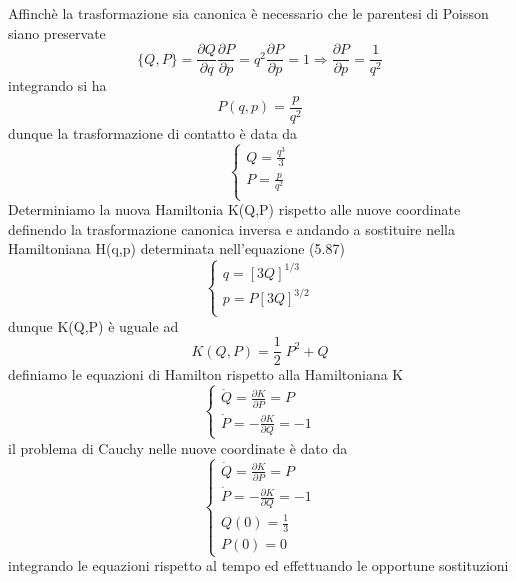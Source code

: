 Affinch\`{e} la trasformazione sia canonica \`{e} necessario che le parentesi di Poisson siano preservate
\begin{equation*}
	\{Q,P\} = \frac{\partial Q}{\partial q}\frac{\partial P}{\partial p}= q^2 \frac{\partial P}{\partial p} = 1 \Rightarrow \frac{\partial P}{\partial p} = \frac{1}{q^2}
\end{equation*}
integrando si ha 
\begin{equation}
	P(q,p) = \frac{p}{q^2}
\end{equation}
dunque la trasformazione di contatto \`{e} data da
\begin{equation}
\begin{cases}
		Q = \frac{q^3}{3} \\
		P = \frac{p}{q^2}\\
\end{cases}
\end{equation}
Determiniamo la nuova Hamiltonia K(Q,P) rispetto alle nuove coordinate definendo la trasformazione canonica inversa e andando a sostituire nella Hamiltoniana H(q,p) determinata nell'equazione (5.87)
\begin{equation}
	\begin{cases}
		q = [3Q]^{1/3}\\
		p = P[3Q]^{3/2}\\
	\end{cases}
\end{equation}
dunque K(Q,P) \`{e} uguale ad 
\begin{equation}
	K(Q,P) = \frac{1}{2}\;P^2 + Q
\end{equation}
definiamo le equazioni di Hamilton rispetto alla Hamiltoniana K
\begin{equation}
	\begin{cases}
		\dot{Q} = \frac{\partial K}{\partial P}=P\\
		\dot{P} = - \frac{\partial K}{\partial Q} = -1
	\end{cases}
\end{equation}
il problema di Cauchy nelle nuove coordinate \`{e} dato da 
\begin{equation}
	\begin{cases}
		\dot{Q} = \frac{\partial K}{\partial P}=P\\
		\dot{P} = - \frac{\partial K}{\partial Q} = -1\\
		Q(0) = \frac{1}{3}\\
		P(0) = 0
	\end{cases}
\end{equation}
integrando le equazioni rispetto al tempo ed effettuando le opportune sostituzioni 
